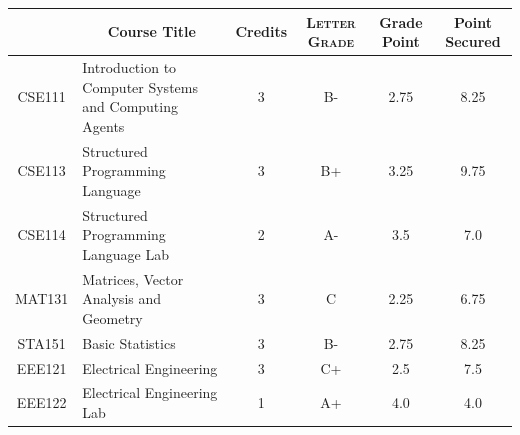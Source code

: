 \documentclass[11pt]{article}
\newcommand*{\numtwo}[1]{\pgfmathprintnumber[
                    fixed, precision=2, fixed zerofill=true]{#1}}
\begin{document}
                \begin{center}
                    \renewcommand{\arraystretch}{1.08}
                    
                \begin{tabular}{|c|l|c|>{\scshape}c|c|c|}
                \hline  \rule[-1ex]{0pt}{3.5ex} {\centering{\bf Course Code}} &  \multicolumn{1}{c|}{\textbf{Course Title}}  & {\bf Credits} & {\bf Letter Grade} & {\bf Grade Point} & {\bf Point Secured}  \\ 
                \hline   CSE111 &  Introduction to Computer Systems and Computing Agents		 & 3 & B- & 2.75 & 8.25 \\ %
                \hline   CSE113 &  Structured Programming Language		 & 3 & B+ & 3.25 & 9.75 \\ %
                \hline   CSE114 &  Structured Programming Language Lab		 & 2 & A- & 3.5 & 7.0 \\ %
                \hline   MAT131 &  Matrices, Vector Analysis and Geometry		 & 3 & C & 2.25 & 6.75 \\ %
                \hline   STA151 &  Basic Statistics		 & 3 & B- & 2.75 & 8.25 \\ %
                \hline   EEE121 &  Electrical Engineering		 & 3 & C+ & 2.5 & 7.5 \\ %
                \hline   EEE122 &  Electrical Engineering Lab		 & 1 & A+ & 4.0 & 4.0 \\ %

\hline                %
                \end{tabular}
                \end{center}
                \renewcommand{\arraystretch}{1.03}
\end{document}
